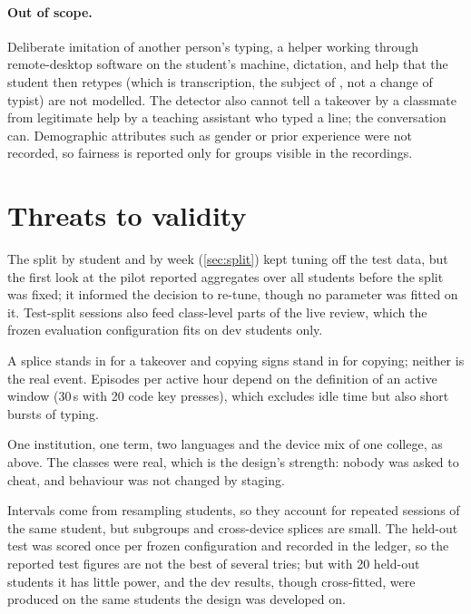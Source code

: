\paragraph{Out of scope.} Deliberate imitation of another person's typing, a
helper working through remote-desktop software on the student's machine,
dictation, and help that the student then retypes (which is transcription, the
subject of , not a change of typist) are not modelled. The detector also
cannot tell a takeover by a classmate from legitimate help by a teaching
assistant who typed a line; the conversation can. Demographic attributes such
as gender or prior experience were not recorded, so fairness is reported only
for groups visible in the recordings.

\section{Threats to validity}
\label{sec:disc-validity}
\begin{description}[leftmargin=1.5em,style=nextline]
  \item[Internal validity] The split by student and by week (\cref{sec:split})
    kept tuning off the test data, but the first look at the pilot reported
    aggregates over all students before the split was fixed; it informed the
    decision to re-tune, though no parameter was fitted on it. Test-split
    sessions also feed class-level parts of the live review, which the frozen
    evaluation configuration fits on dev students only.
  \item[Construct validity] A splice stands in for a takeover and copying signs
    stand in for copying; neither is the real event. Episodes per active hour
    depend on the definition of an active window (30\,s with 20 code key
    presses), which excludes idle time but also short bursts of typing.
  \item[External validity] One institution, one term, two languages and the
    device mix of one college, as above. The classes were real, which is the
    design's strength: nobody was asked to cheat, and behaviour was not changed
    by staging.
  \item[Conclusion validity] Intervals come from resampling students, so they
    account for repeated sessions of the same student, but subgroups and
    cross-device splices are small. The held-out test was scored once per
    frozen configuration and recorded in the ledger, so the reported test
    figures are not the best of several tries; but with 20 held-out students it
    has little power, and the dev results, though cross-fitted, were produced
    on the same students the design was developed on.
\end{description}

